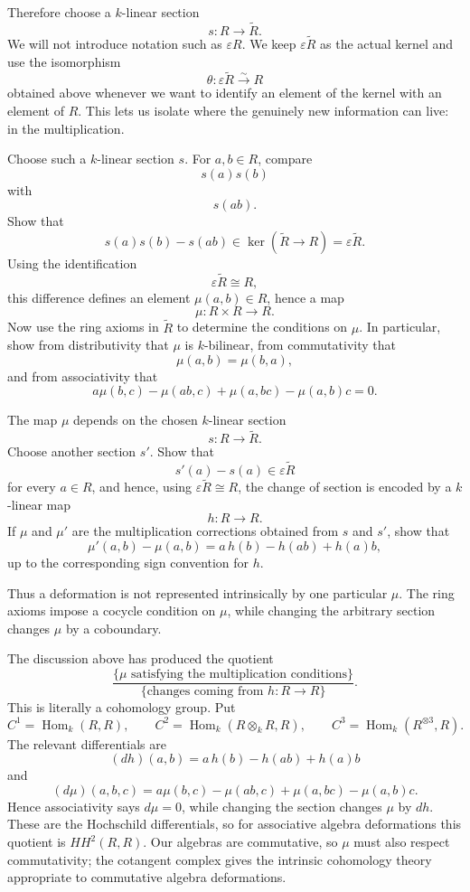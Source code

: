 \noindent
Therefore choose a $k$-linear section
$$
s:R\longrightarrow\widetilde R.
$$
We will not introduce notation such as $\varepsilon R$. We keep $\varepsilon\widetilde R$ as the actual kernel and use the isomorphism
$$
\theta:\varepsilon\widetilde R\xrightarrow{\sim}R
$$
obtained above whenever we want to identify an element of the kernel with an element of $R$. This lets us isolate where the genuinely new information can live: in the multiplication.

\begin{exercise}
\label{exercise-first-order-deformed-multiplication}
Choose such a $k$-linear section $s$. For $a,b\in R$, compare
$$
s(a)s(b)
$$
with
$$
s(ab).
$$
Show that
$$
s(a)s(b)-s(ab)
\in\ker(\widetilde R\to R)
=\varepsilon\widetilde R.
$$
Using the identification
$$
\varepsilon\widetilde R\cong R,
$$
this difference defines an element $\mu(a,b)\in R$, hence a map
$$
\mu:R\times R\longrightarrow R.
$$
Now use the ring axioms in $\widetilde R$ to determine the conditions on $\mu$. In particular, show from distributivity that $\mu$ is $k$-bilinear, from commutativity that
$$
\mu(a,b)=\mu(b,a),
$$
and from associativity that
$$
a\mu(b,c)-\mu(ab,c)+\mu(a,bc)-\mu(a,b)c=0.
$$
\end{exercise}

\begin{exercise}
\label{exercise-change-section-multiplication-correction}
The map $\mu$ depends on the chosen $k$-linear section
$$
s:R\longrightarrow\widetilde R.
$$
Choose another section $s'$. Show that
$$
s'(a)-s(a)\in\varepsilon\widetilde R
$$
for every $a\in R$, and hence, using $\varepsilon\widetilde R\cong R$, the change of section is encoded by a $k$-linear map
$$
h:R\longrightarrow R.
$$
If $\mu$ and $\mu'$ are the multiplication corrections obtained from $s$ and $s'$, show that
$$
\mu'(a,b)-\mu(a,b)
=
a\,h(b)-h(ab)+h(a)b,
$$
up to the corresponding sign convention for $h$.
\end{exercise}

\noindent
Thus a deformation is not represented intrinsically by one particular $\mu$. The ring axioms impose a cocycle condition on $\mu$, while changing the arbitrary section changes $\mu$ by a coboundary.

\begin{remark}
The discussion above has produced the quotient
$$
\frac{
\{\mu\text{ satisfying the multiplication conditions}\}
}{
\{\text{changes coming from }h:R\to R\}
}.
$$
This is literally a cohomology group. Put
$$
C^1=\operatorname{Hom}_k(R,R),\qquad
C^2=\operatorname{Hom}_k(R\otimes_kR,R),\qquad
C^3=\operatorname{Hom}_k(R^{\otimes3},R).
$$
The relevant differentials are
$$
(dh)(a,b)=a\,h(b)-h(ab)+h(a)b
$$
and
$$
(d\mu)(a,b,c)
=a\mu(b,c)-\mu(ab,c)+\mu(a,bc)-\mu(a,b)c.
$$
Hence associativity says $d\mu=0$, while changing the section changes $\mu$ by $dh$. These are the Hochschild differentials, so for associative algebra deformations this quotient is $HH^2(R,R)$. Our algebras are commutative, so $\mu$ must also respect commutativity; the cotangent complex gives the intrinsic cohomology theory appropriate to commutative algebra deformations.
\end{remark}

